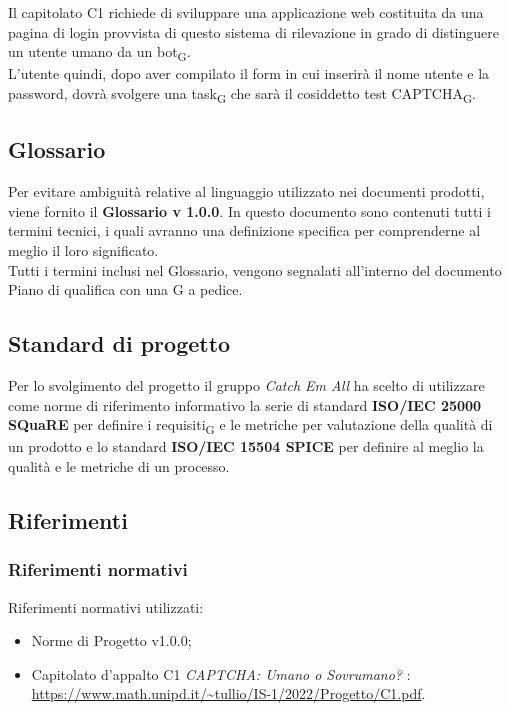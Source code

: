 Il capitolato C1 richiede di sviluppare una applicazione web costituita da una pagina di login provvista di questo sistema di rilevazione in grado di distinguere un utente umano da un bot\textsubscript{G}.\\
L'utente quindi, dopo aver compilato il form in cui inserirà il nome utente e la password, dovrà svolgere una task\textsubscript{G} che sarà il cosiddetto test CAPTCHA\textsubscript{G}.



\subsection{Glossario}
Per evitare ambiguità relative al linguaggio utilizzato nei documenti prodotti, viene fornito il \textbf{Glossario v 1.0.0}. In questo documento sono contenuti tutti i termini tecnici, i quali avranno una definizione specifica per comprenderne al meglio il loro significato.\\
Tutti i termini inclusi nel Glossario, vengono segnalati all'interno del documento Piano di qualifica con una G a pedice.


\subsection{Standard di progetto}
Per lo svolgimento del progetto il gruppo \textit{Catch Em All} ha scelto di utilizzare come norme di riferimento informativo la serie di standard \textbf{ISO/IEC 25000 SQuaRE} per definire i requisiti\textsubscript{G} e le metriche per valutazione della qualità di un prodotto e lo standard \textbf{ISO/IEC 15504 SPICE} per definire al meglio la qualità e le metriche di un processo.

\subsection{Riferimenti}
\subsubsection{Riferimenti normativi}
Riferimenti normativi utilizzati:
\begin{itemize}
	\item Norme di Progetto v1.0.0;
	\item Capitolato d'appalto C1 \textit{CAPTCHA: Umano o Sovrumano?} : \\
		\url{https://www.math.unipd.it/~tullio/IS-1/2022/Progetto/C1.pdf}.
\end{itemize}
